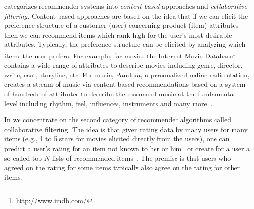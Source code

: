 \documentclass[nojss]{jss}
\begin{document}
\cite{recommender:Ansari:2000} categorizes recommender systems into
\emph{content-based} approaches and \emph{collaborative filtering.} 
Content-based approaches are based on the idea that
if we can elicit the preference structure of a customer (user)
concerning product (item) attributes then we can recommend items
which rank high for the user's most desirable attributes. 
Typically, the preference structure can be elicited by analyzing which 
items the user prefers. For example, for movies the Internet Movie 
Database\footnote{\url{http://www.imdb.com/}}
contains a wide range of attributes to describe movies including
genre, director, write, cast, storyline, etc. For music, Pandora,
a personalized online radio station,
creates a stream of music via content-based recommendations
based on a system of hundreds of attributes 
to describe the essence of music at the
fundamental level including 
rhythm, feel, influences, instruments and many 
more~\citep{recommender:Joyce:2006}.

In  we concentrate on the second category of recommender
algorithms called collaborative filtering.
The idea is that given rating data by many users for many items
(e.g., 1 to 5 stars for movies elicited directly from the users), 
one can predict a user's rating for an item
not known to her or him~\citep[see, e.g.,][]{recommender:Goldberg:1992} 
or create
for a user a so called top-$N$ lists of recommended 
items~\citep[see, e.g.,][]{recommender:Deshpande:2004}.
The premise is that users who agreed on the rating for some items 
typically also agree on the rating for other items.
\end{document}
